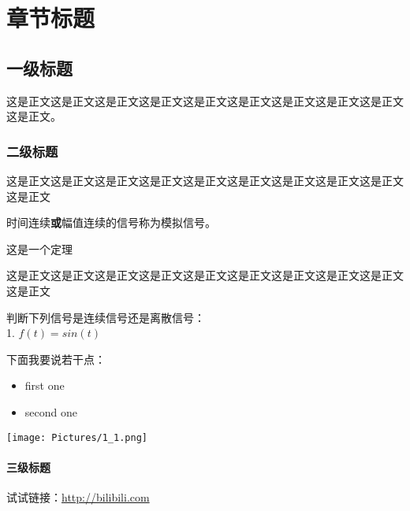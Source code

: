 \documentclass[11pt,fleqn, openany]{book} %
\begin{document}

\chapter{章节标题}
\section{一级标题}
这是正文这是正文这是正文这是正文这是正文这是正文这是正文这是正文这是正文这是正文。
\subsection{二级标题}
这是正文这是正文这是正文这是正文这是正文这是正文这是正文这是正文这是正文这是正文
\begin{definition}[模拟信号]
    时间连续\textbf{或}幅值连续的信号称为模拟信号。
\end{definition}

\begin{theorem}[冲激函数的筛选性质]
    这是一个定理
\end{theorem}

这是正文这是正文这是正文这是正文这是正文这是正文这是正文这是正文这是正文这是正文

\begin{example}
    判断下列信号是连续信号还是离散信号：\\
    1. $f(t)=sin(t)$\\
\end{example}

下面我要说若干点：
\begin{itemize}
    \item first one
    \item second one
\end{itemize}

\begin{center}
    \texttt{[image: Pictures/1\_1.png]}
\end{center}

\subsubsection{三级标题}
试试链接：\url{http://bilibili.com}
\end{document}

